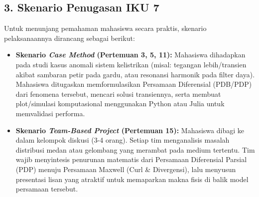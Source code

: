\documentclass[11pt,a4paper]{article}
\begin{document}
\subsection*{3. Skenario Penugasan IKU 7}
Untuk menunjang pemahaman mahasiswa secara praktis, skenario pelaksanaannya dirancang sebagai berikut:
\begin{itemize}[leftmargin=*]
    \item \textbf{Skenario \textit{Case Method} (Pertemuan 3, 5, 11):} Mahasiswa dihadapkan pada studi kasus anomali sistem kelistrikan (misal: tegangan lebih/transien akibat sambaran petir pada gardu, atau resonansi harmonik pada filter daya). Mahasiswa ditugaskan memformulasikan Persamaan Diferensial (PDB/PDP) dari fenomena tersebut, mencari solusi transiennya, serta membuat plot/simulasi komputasional menggunakan Python atau Julia untuk memvalidasi performa.
    \item \textbf{Skenario \textit{Team-Based Project} (Pertemuan 15):} Mahasiswa dibagi ke dalam kelompok diskusi (3-4 orang). Setiap tim menganalisis masalah distribusi medan atau gelombang yang merambat pada medium tertentu. Tim wajib menyintesis penurunan matematis dari Persamaan Diferensial Parsial (PDP) menuju Persamaan Maxwell (Curl \& Divergensi), lalu menyusun presentasi lisan yang atraktif untuk memaparkan makna fisis di balik model persamaan tersebut.
\end{itemize}
\end{document}
